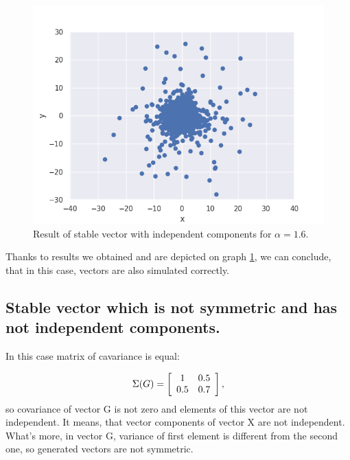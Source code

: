 \documentclass{article}
\begin{document}
	\begin{figure}[H]
		\centering
		\includegraphics[width=1\linewidth]{images/ex_1_b_alpha_stable_vector_simulation_symmetric_continous_scatter}
		\caption{Result of stable vector with independent components for $\alpha=1.6$.}\label{2}
	\end{figure}
	Thanks to results we obtained and are depicted on graph \ref{2}, we can conclude, that in this case, vectors are also simulated correctly.
	
	\subsection{Stable vector which is not symmetric and has not independent components.}
	
	In this case matrix of cavariance is equal:
	
	\[\Sigma(G) = \left[{\begin{array}{*{20}c}
			1 & 0.5\\
			0.5 & 0.7\end{array} } \right],\]
	so covariance of vector G is not zero and elements of this vector are not independent. It means, that vector components of vector X are not independent. What's more, in vector G, variance of first element is different from the second one, so generated vectors are not symmetric.
	
\end{document}
